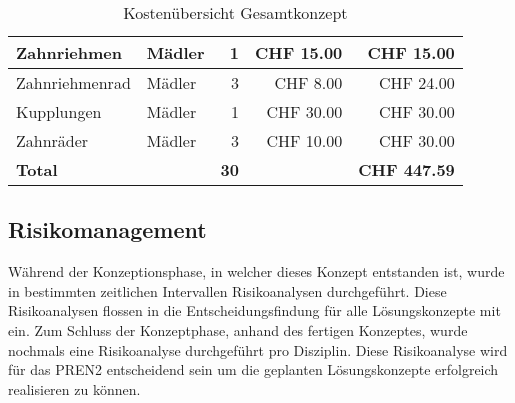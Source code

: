 \documentclass[../../main.tex]{subfiles}
\begin{document}
\begin{table}[H]
\begin{tabular}{|p{6cm}|l|r|r|r|}
    Zahnriehmen                                             & Mädler             & 1               & CHF 15.00           & CHF 15.00             \\ \hline \nocite{MadlerZahnriemen}
    Zahnriehmenrad                                          & Mädler             & 3               & CHF 8.00            & CHF 24.00             \\ \hline \nocite{MadlerZahnriemenrad}
    Kupplungen                                              & Mädler             & 1               & CHF 30.00           & CHF 30.00             \\ \hline \nocite{MadlerKupplung}
    Zahnräder                                               & Mädler             & 3               & CHF 10.00           & CHF 30.00             \\ \hline \hline \nocite{MadlerZahnrad}
    \textbf{Total}                                          & \textbf{}          & \textbf{30}     & \textbf{}           & \textbf{CHF 447.59}   \\ \hline
    \end{tabular}
    \caption{Kostenübersicht Gesamtkonzept}
    \label{tab:kosten_total}
    \end{table}

\pagebreak

\subsection{Risikomanagement}
Während der Konzeptionsphase, in welcher dieses Konzept entstanden ist, wurde in bestimmten zeitlichen Intervallen Risikoanalysen durchgeführt. Diese Risikoanalysen flossen in die Entscheidungsfindung für alle Lösungskonzepte mit ein. Zum Schluss der Konzeptphase, anhand des fertigen Konzeptes, wurde nochmals eine Risikoanalyse durchgeführt pro Disziplin. Diese Risikoanalyse wird für das PREN2 entscheidend sein um die geplanten Lösungskonzepte erfolgreich realisieren zu können.
\end{document}
